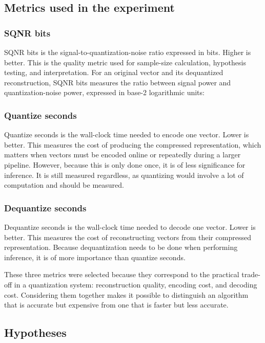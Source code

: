 \documentclass[11pt]{article}
\begin{document}
\subsection{Metrics used in the experiment}

\subsubsection{SQNR bits}

SQNR bits is the signal-to-quantization-noise ratio expressed in bits. Higher is better. This is the quality metric used for sample-size calculation,
hypothesis testing, and interpretation. For an original vector and its dequantized reconstruction, SQNR bits measures the ratio between signal power
and quantization-noise power, expressed in base-2 logarithmic units:

\subsubsection{Quantize seconds}

Quantize seconds is the wall-clock time needed to encode one vector. Lower is better. 
This measures the cost of producing the compressed representation, which matters when vectors must be encoded online or repeatedly during a larger pipeline.
However, because this is only done once, it is of less significance for inference. It is still measured regardless, as quantizing would involve a lot of computation and should be measured.

\subsubsection{Dequantize seconds}

Dequantize seconds is the wall-clock time needed to decode one vector. Lower is better. This measures the cost of reconstructing vectors from their compressed representation.
Because dequantization needs to be done when performing inference, it is of more importance than quantize seconds.

These three metrics were selected because they correspond to the practical trade-off in a quantization system: reconstruction quality, encoding cost, and decoding cost.
Considering them together makes it possible to distinguish an algorithm that is accurate but expensive from one that is faster but less accurate.

\subsection{Hypotheses}
\end{document}
